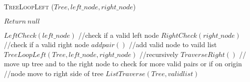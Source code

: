 \documentclass{article}
\begin{document}
\begin{algorithm} \caption{\textsc{TreeLoopLeft} ($Tree,left\_node,right\_node$)}\label{alg:seb}
    \begin{algorithmic}[1]
            \State$Return\ null$
        \EndIf{}

        \State$LeftCheck(left\_node)$ //check if a valid left node
        \State$RightCheck(right\_node)$ //check if a valid right node
            \State$addpair()$ //add valid node to vaild list
            \State$TreeLoopLeft(Tree,left\_node,right\_node)$ //recursively
            \Else{}
            \State$TraverseRight()$ // move up tree and to the right node to check for more valid pairs or if on origin 							       //node move to right side of tree
        \EndIf{}
        \State$ListTraverse(Tree, validlist)$
    \end{algorithmic}
\end{algorithm}
\end{document}
